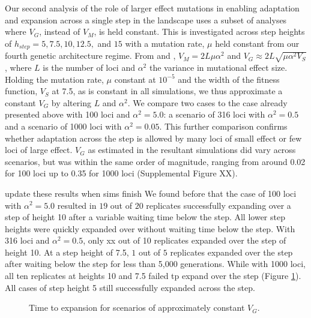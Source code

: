 Our second analysis of the role of larger effect mutations in enabling adaptation and expansion across a single step in the landscape uses a subset of analyses where $V_G$, instead of $V_M$, is held constant. 
This is investigated across step heights of $h_{step} = 5, 7.5, 10, 12.5,$ and $15$ with a mutation rate, $\mu$ held constant from our fourth genetic architecture regime. From \citet{Lande:1975} and \citet{Johnson:2005}, $V_M = 2 L \mu \alpha^2$ and $V_G \approx 2 L \sqrt{\mu \alpha^2 V_S}$, where $L$ is the number of loci and $\alpha^2$ the variance in mutational effect size. Holding the mutation rate, $\mu$ constant at $10^{-5}$ and the width of the fitness function, $V_S$ at 7.5, as is constant in all simulations, we thus approximate a constant $V_G$ by altering $L$ and $\alpha^2$. We compare two cases to the case already presented above with 100 loci and $\alpha^2 = 5.0$: a scenario of 316 loci with $\alpha^2 = 0.5$ and a scenario of 1000 loci with $\alpha^2 = 0.05$. This further comparison confirms whether adaptation across the step is allowed by many loci of small effect or few loci of large effect. $V_G$ as estimated in the resultant simulations did vary across scenarios, but was within the same order of magnitude, ranging from around 0.02 for 100 loci up to 0.35 for 1000 loci (Supplemental Figure \color{red}XX\color{black}). 

\color{red} update these results when sims finish \color{black}
We found before that the case of 100 loci with $\alpha^2 = 5.0$ resulted in $19$ out of $20$ replicates successfully expanding over a step of height 10 after a variable waiting time below the step. All lower step heights were quickly expanded over without waiting time below the step. With 316 loci and $\alpha^2 = 0.5$, only xx out of 10 replicates expanded over the step of height 10. At a step height of 7.5, $1$ out of $5$ replicates expanded over the step after waiting below the step for less than 5,000 generations. While with 1000 loci, all ten replicates at heights 10 and 7.5 failed tp expand over the step (Figure \ref{fig:constVG}). %
All cases of step height 5 still successfully expanded across the step.

\begin{figure}[h]
\centering
{}
\caption[Time to expansion with constant $V_G$.]{Time to expansion for scenarios of approximately constant $V_G$.}
\label{fig:constVG}
\end{figure}


